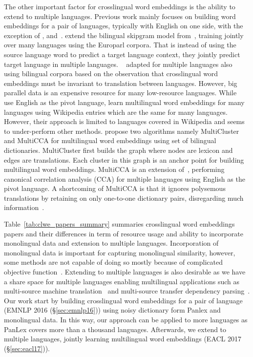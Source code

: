 \documentclass[12pt,twoside,final,hidelinks]{ltthesis}
\theoremstyle{definition}
\newcommand\emnlpvi{EMNLP 2016 (\S\ref{sec:emnlp16})}
\newcommand\eaclvii{EACL 2017 (\S\ref{sec:eacl17})}
\begin{document}
The other important factor for crosslingual word embeddings is the ability to extend to multiple languages. 
Previous work mainly focuses on building word embeddings for a pair of languages, typically 
with English on one side, with the exception of ,  and~. 
 extend the bilingual skipgram model from~, training jointly over many languages using the Europarl corpora. That is instead of using the source language word to predict a target language context, they jointly predict target language in multiple languages. 
~ adapted for multiple languages also using bilingual corpora based on the observation that crosslingual word embeddings must be invariant to translation between languages. However, big parallel data is an expensive resource  for many low-resource languages. 
While~ use English as the pivot language, 
learn multilingual word embeddings for many languages using Wikipedia entries which are the same for many languages.
However, their approach is limited to languages covered in Wikipedia and seems to under-perform other methods.
 propose two algorithms namely MultiCluster and MultiCCA 
for multilingual word embeddings using set of bilingual dictionaries. MultiCluster first 
builds the graph where nodes are lexicon and edges are translations. Each cluster in this 
graph is an anchor point for building multilingual word embeddings. MultiCCA is an extension 
of~, performing canonical correlation analysis (CCA) for 
multiple languages using English as the pivot language. A shortcoming of MultiCCA is that 
it ignores polysemous translations by retaining on only one-to-one dictionary 
pairs, disregarding much information~\cite{icml2015_gouws15}. 

Table~\ref{tab:clwe_papers_summary}
summaries crosslingual word embeddings papers and their differences in term of resource usage and 
ability to incorporate monolingual data and extension to multiple languages. Incorporation of monolingual data is 
important for capturing monolingual similarity, however, some methods are not capable of doing so 
mostly because of complicated objective function~\cite{Luong-etal:naacl15:bivec}. Extending to multiple languages is 
also desirable as we have a share space for multiple languages enabling multilingual 
applications such as multi-source machine translation~\cite{zoph-knight:2016:N16-1} and 
multi-source transfer dependency parsing~\cite{McDonald:2011:MTD}. Our work start by building crosslingual word embeddings 
for a pair of language (\emnlpvi) using noisy dictionary form Panlex and  monolingual data.
In this way, our approach can be applied to more languages as PanLex covers more than a thousand languages. 
Afterwards, we extend to multiple languages, jointly learning multilingual word embeddings (\eaclvii). 
\end{document}
